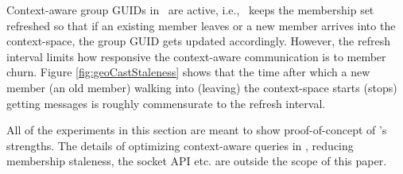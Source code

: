 Context-aware group GUIDs in \auspice\ are active, i.e., \auspice\ keeps the membership set refreshed so that if an existing member leaves or a new member arrives into the context-space, the group GUID gets updated accordingly. However, the refresh interval limits how responsive the context-aware communication is to member churn. Figure \ref{fig:geoCastStaleness} shows that the time after which a new member (an old member) walking into (leaving) the context-space starts (stops) getting messages is roughly commensurate to the refresh interval. 

All of the experiments in this section are meant to show proof-of-concept of \auspice's strengths. The details of optimizing context-aware queries in \auspice, reducing membership staleness, the socket API etc. \cite{msocketTR} are outside the scope of this paper. 













